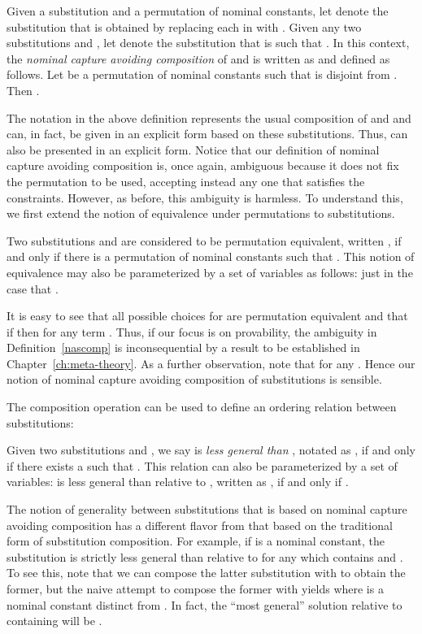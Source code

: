 \begin{definition}\label{nascomp}
Given a substitution  and a permutation  of nominal
constants, let  denote
the substitution that is obtained by replacing each  in 
with . Given any two substitutions  and , let
 denote the substitution that is such that
. In this context, the {\em
  nominal capture   avoiding composition} of  and  is
written as  and defined as follows. Let  be a
permutation of nominal constants such that
 is disjoint from . Then
.
\end{definition}\label{substequiv}
The notation  in the above definition represents
the usual composition of  and  and can, in fact, be
given in an explicit form based on these substitutions. Thus,  can also be presented in an explicit form. Notice that our
definition of nominal capture avoiding composition is, once again,
ambiguous because it does not fix the permutation to be used,
accepting instead any one that satisfies the constraints. However, as
before, this ambiguity is harmless. To understand this, we first
extend the notion of equivalence under permutations to substitutions.
\begin{definition}
Two substitutions  and  are considered to be permutation
equivalent, written , if and only if there is a
permutation of nominal constants  such that . This notion of equivalence may also be parameterized by a
set of variables  as follows: 
just in the case that .
\end{definition}
It is easy to see that all possible choices for 
are permutation equivalent and that if 
then  for any term .
Thus, if our focus is on provability, the ambiguity in
Definition~\ref{nascomp} is inconsequential by a result to be
established in Chapter~\ref{ch:meta-theory}. As a further observation,
note that 
for any . Hence our notion of nominal capture avoiding composition
of substitutions is sensible.

The composition operation can be used to define an ordering
relation between substitutions:
\begin{definition}\label{nasordering}
Given two substitutions  and , we say  is {\em
  less general than} , notated as , if and
only if there exists a  such that . This relation can also be parameterized by a
set of variables:  is less general than 
relative to , written as , if and
only if .
\end{definition}
The notion of generality between substitutions that is based on
nominal capture avoiding composition has a different flavor from that
based on the traditional form of substitution composition. For
example, if  is a nominal constant, the substitution  is
strictly less general than  relative to  for
any  which contains  and . To see this, note that we can
compose the latter substitution with  to obtain
the former, but the naive attempt to compose the former with
 yields  where  is a nominal constant
distinct from . In fact, the ``most general'' solution relative to
 containing  will be .

